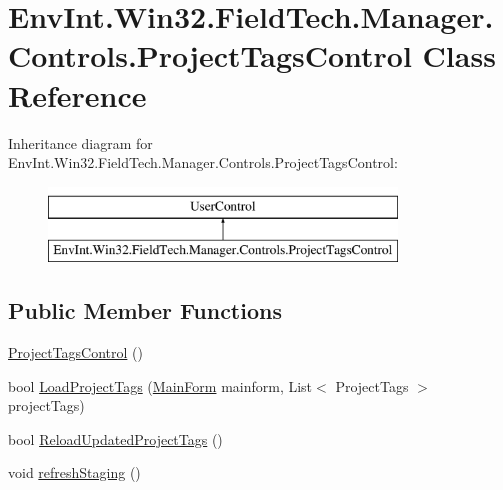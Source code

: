 \hypertarget{class_env_int_1_1_win32_1_1_field_tech_1_1_manager_1_1_controls_1_1_project_tags_control}{}\section{Env\+Int.\+Win32.\+Field\+Tech.\+Manager.\+Controls.\+Project\+Tags\+Control Class Reference}
\label{class_env_int_1_1_win32_1_1_field_tech_1_1_manager_1_1_controls_1_1_project_tags_control}
Inheritance diagram for Env\+Int.\+Win32.\+Field\+Tech.\+Manager.\+Controls.\+Project\+Tags\+Control\+:\begin{figure}[H]
\begin{center}
\leavevmode
\includegraphics[height=2.000000cm]{class_env_int_1_1_win32_1_1_field_tech_1_1_manager_1_1_controls_1_1_project_tags_control}
\end{center}
\end{figure}
\subsection*{Public Member Functions}
\begin{DoxyCompactItemize}
\item 
\hyperlink{class_env_int_1_1_win32_1_1_field_tech_1_1_manager_1_1_controls_1_1_project_tags_control_a44c863a2ba066f69aa55c1928da8c7dd}{Project\+Tags\+Control} ()
\item 
bool \hyperlink{class_env_int_1_1_win32_1_1_field_tech_1_1_manager_1_1_controls_1_1_project_tags_control_a345a196977bbe72a760d80de0968a610}{Load\+Project\+Tags} (\hyperlink{class_env_int_1_1_win32_1_1_field_tech_1_1_manager_1_1_main_form}{Main\+Form} mainform, List$<$ Project\+Tags $>$ project\+Tags)
\item 
bool \hyperlink{class_env_int_1_1_win32_1_1_field_tech_1_1_manager_1_1_controls_1_1_project_tags_control_a30d4a19a671a241d782611605020358c}{Reload\+Updated\+Project\+Tags} ()
\item 
void \hyperlink{class_env_int_1_1_win32_1_1_field_tech_1_1_manager_1_1_controls_1_1_project_tags_control_ae10a0c01e52cdfbbc48dbb726e15f278}{refresh\+Staging} ()
\end{DoxyCompactItemize}
